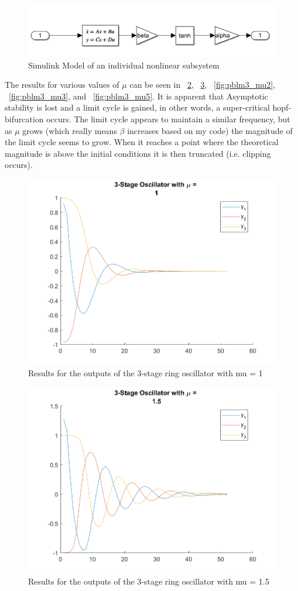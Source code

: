 \documentclass[letter]{article}
\begin{document}
\begin{figure}[p]
	\centering
	\includegraphics[width=0.7\linewidth]{fig/sim_model_HW6_pblm3_subsystem}
	\caption{Simulink Model of an individual nonlinear subsystem}
	\label{fig:simmodelhw6pblm3subsystem}
\end{figure}


The results for various values of $\mu$ can be seen in \figurename \  \ref{fig:pblm3_mu1}, \figurename \ \ref{fig:pblm3_mu15}, \figurename \ \ref{fig:pblm3_mu2}, \figurename \ \ref{fig:pblm3_mu3}, and \figurename \ \ref{fig:pblm3_mu5}. It is apparent that Asymptotic stability is lost and a limit cycle is gained, in other words, a super-critical hopf-bifurcation occurs. The limit cycle appears to maintain a similar frequency, but as $\mu$ grows (which really means $\beta$ increases based on my code) the magnitude of the limit cycle seems to grow. When it reaches a point where the theoretical magnitude is above the initial conditions it is then truncated (i.e. clipping occurs).


\begin{figure}[p]
	\centering
	\includegraphics[width=0.7\linewidth]{fig/HW6_pblm3_results_mu_1}
	\caption{Results for the outputs of the 3-stage ring oscillator with mu = 1}
	\label{fig:pblm3_mu1}
\end{figure}

\begin{figure}[p]
	\centering
	\includegraphics[width=0.7\linewidth]{fig/HW6_pblm3_results_mu_1.5}
	\caption{Results for the outputs of the 3-stage ring oscillator with mu = 1.5}
	\label{fig:pblm3_mu15}
\end{figure}
\end{document}
